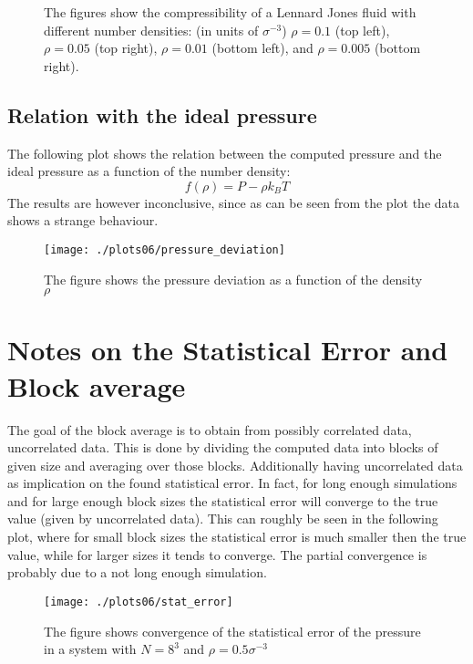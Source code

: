 \documentclass[aps,pra,reprint, onecolumn, rmp]{revtex4-2}
\begin{document}
\begin{figure}[h]
    \centering
    
\end{figure}
\clearpage

\begin{figure}[h]
     \centering
     \caption{The figures show the compressibility of a Lennard Jones fluid with different number densities: (in units of $\sigma^{-3}$) $\rho=0.1$ (top left), $\rho=0.05$ (top right), $\rho=0.01$ (bottom left), and $\rho=0.005$ (bottom right).}
    
\end{figure}



\subsection{Relation with the ideal pressure}
The following plot shows the relation between the computed pressure and the ideal pressure as a function of the number density:
\begin{equation}
	f(\rho) = P - \rho k_B T
\end{equation}
The results are however inconclusive, since as can be seen from the plot the data shows a strange behaviour.
\begin{figure}[h]
          \centering
          \texttt{[image: ./plots06/pressure\_deviation]}
          \caption{The figure shows the pressure deviation as a function of the density $\rho$}
\end{figure}

\section{Notes on the Statistical Error and Block average}
The goal of the block average is to obtain from possibly correlated data, uncorrelated data. This is done by dividing the computed data into blocks of given size and averaging over those blocks. Additionally having uncorrelated data as implication on the found statistical error. In fact, for long enough simulations and for large enough block sizes the statistical error will converge to the true value (given by uncorrelated data). This can roughly be seen in the following plot, where for small block sizes the statistical error is much smaller then the true value, while for larger sizes it tends to converge. The partial convergence is probably due to a not long enough simulation.
\begin{figure}[h]
          \centering
          \texttt{[image: ./plots06/stat\_error]}
          \caption{The figure shows convergence of the statistical error of the pressure in a system with $N=8^3$ and $\rho = 0.5\sigma^{-3}$}
\end{figure}
\end{document}
